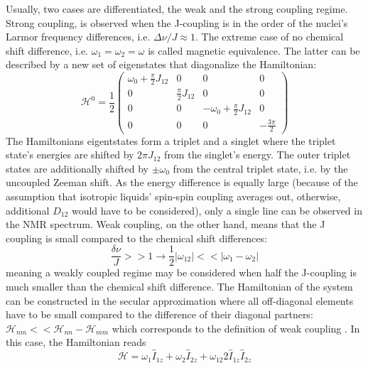             Usually, two cases are differentiated, the weak and the strong coupling regime. Strong coupling, is observed when the J-coupling is in the order of the nuclei's Larmor frequency differences, i.e. $\Delta \nu / J \approx 1$. The extreme case of no chemical shift difference, i.e. $\omega_1 = \omega_2=\omega$ is called magnetic equivalence.
            The latter can be described by a new set of eigenstates that diagonalize the Hamiltonian:
            \begin{equation}
                \mathcal{H}^0 = \frac{1}{2}
                \begin{pmatrix}
                    \omega_0+ \tfrac{\pi}{2} J_{12} & 0 & 0 & 0\\
                    0 &  \tfrac{\pi}{2}J_{12} & 0 & 0 \\
                    0 & 0 & -\omega_0 + \tfrac{\pi}{2}J_{12} & 0\\
                    0 & 0 & 0 & -\tfrac{3\pi}{2}
                \end{pmatrix}
            \end{equation}
            The Hamiltonians eigentstates form a triplet and a singlet where the triplet state's energies are shifted by $2\pi J_{12}$ from the singlet's energy. The outer triplet states are additionally shifted by $\pm\omega_0$ from the central triplet state, i.e. by the uncoupled Zeeman shift.
            As the energy difference is equally large (because of the assumption that isotropic liquids' spin-spin coupling averages out, otherwise, additional $D_{12}$ would have to be considered), only a single line can be observed in the NMR spectrum.
            Weak coupling, on the other hand, means that the J coupling is small compared to the chemical shift differences:
            \begin{equation*}
                \frac{\delta\nu}{J} >> 1 \rightarrow \frac{1}{2} |\omega_{12}| << |\omega_1-\omega_2|
            \end{equation*}
            meaning a weakly coupled regime may be considered when half the J-coupling is much smaller than the chemical shift difference. The Hamiltonian of the system can be constructed in the secular approximation where all off-diagonal elements have to be small compared to the difference of their diagonal partners: $\mathcal{H}_{nm} << \mathcal{H}_{nn} - \mathcal{H}_{mm}$ which corresponds to the definition of weak coupling \cite{levitt_spin_nodate}.
            In this case, the Hamiltonian reads
            \begin{equation}
                \mathcal{H} = \omega_1\hat{I}_{1z} + \omega_2\hat{I}_{2z} + \omega_{12}2\hat{I}_{1z}\hat{I}_{2z}
            \end{equation}
